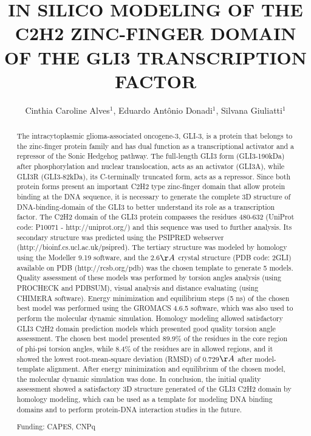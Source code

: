 \documentclass[twoside]{article}
\title{\vspace{-15mm}\fontsize{24pt}{10pt}\selectfont\textbf{IN SILICO MODELING OF THE C2H2 ZINC-FINGER DOMAIN OF THE GLI3 TRANSCRIPTION FACTOR}} %
\author{Cinthia Caroline Alves$^1$, Eduardo Ant\^onio Donadi$^1$, Silvana Giuliatti$^1$}
\affil{1 RIBEIR\~AO PRETO MEDICAL SCHOOL, USP\\ }
\date{}
\begin{document}
\maketitle %

\thispagestyle{fancy} %


\begin{abstract}
The intracytoplasmic glioma-associated oncogene-3, GLI-3, is a protein that belongs to the zinc-finger protein family and has dual function as a transcriptional activator and a repressor of the Sonic Hedgehog pathway. The full-length GLI3 form (GLI3-190kDa) after phosphorylation and nuclear translocation, acts as an activator (GLI3A), while GLI3R (GLI3-82kDa), its C-terminally truncated form, acts as a repressor. Since both protein forms present an important C2H2 type zinc-finger domain that allow protein binding at the DNA sequence, it is necessary to generate the complete 3D structure of DNA-binding-domain of the GLI3 to better understand its role as a transcription factor. The C2H2 domain of the GLI3 protein compasses the residues 480-632 (UniProt code: P10071 - http://uniprot.org/) and this sequence was used to further analysis. Its secondary structure was predicted using the PSIPRED webserver (http://bioinf.cs.ucl.ac.uk/psipred). The tertiary structure was modeled by homology using the Modeller 9.19 software, and the 2.6$\AA$ crystal structure (PDB code: 2GLI) available on PDB (http://rcsb.org/pdb) was the chosen template to generate 5 models. Quality assessment of these models was performed by torsion angles analysis (using PROCHECK and PDBSUM), visual analysis and distance evaluating (using CHIMERA software). Energy minimization and equilibrium steps (5 ns) of the chosen best model was performed using the GROMACS 4.6.5 software, which was also used to perform the molecular dynamic simulation. Homology modeling allowed satisfactory GLI3 C2H2 domain prediction models which presented good quality torsion angle assessment. The chosen best model presented 89.9\% of the residues in the core region of phi-psi torsion angles, while 8.4\% of the residues are in allowed regions, and it showed the lowest root-mean-square deviation (RMSD) of 0.729$\AA$ after model-template alignment. After energy minimization and equilibrium of the chosen model, the molecular dynamic simulation was done. In conclusion, the initial quality assessment showed a satisfactory 3D structure generated of the GLI3 C2H2 domain by homology modeling, which can be used as a template for modeling DNA binding domains and to perform protein-DNA interaction studies in the future.

Funding: CAPES, CNPq
\end{abstract}
\end{document}
